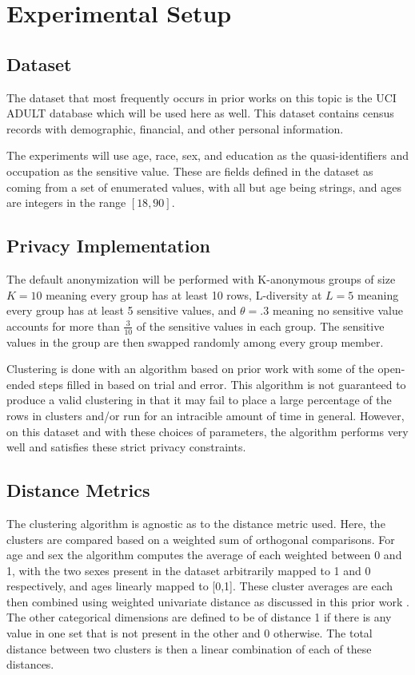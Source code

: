 \section{Experimental Setup}

\subsection{Dataset}
The dataset that most frequently occurs in prior works on this topic is the UCI ADULT database\cite{adultDatabase} which will be used here as well. This dataset contains census records with demographic, financial, and other personal information.

The experiments will use age, race, sex, and education as the quasi-identifiers and occupation as the sensitive value. These are fields defined in the dataset as coming from a set of enumerated values, with all but age being strings, and ages are integers in the range $[18,90]$.

\subsection{Privacy Implementation}
The default anonymization will be performed with K-anonymous groups of size $K=10$ meaning every group has at least 10 rows, L-diversity at $L=5$ meaning every group has at least 5 sensitive values, and $\theta=.3$ meaning no sensitive value accounts for more than $\frac{3}{10}$ of the sensitive values in each group. The sensitive values in the group are then swapped randomly among every group member.

Clustering is done with an algorithm based on prior work\cite{yangEnhanced} with some of the open-ended steps filled in based on trial and error. This algorithm is not guaranteed to produce a valid clustering in that it may fail to place a large percentage of the rows in clusters and/or run for an intracible amount of time in general. However, on this dataset and with these choices of parameters, the algorithm performs very well and satisfies these strict privacy constraints.

\subsection{Distance Metrics}
The clustering algorithm is agnostic as to the distance metric used. Here, the clusters are compared based on a weighted sum of orthogonal comparisons. For age and sex the algorithm computes the average of each weighted between 0 and 1, with the two sexes present in the dataset arbitrarily mapped to 1 and 0 respectively, and ages linearly mapped to [0,1]. These cluster averages are each then combined using weighted univariate distance as discussed in this prior work \cite{domingePracticalCluster}. The other categorical dimensions are defined to be of distance 1 if there is any value in one set that is not present in the other and 0 otherwise. The total distance between two clusters is then a linear combination of each of these distances.


